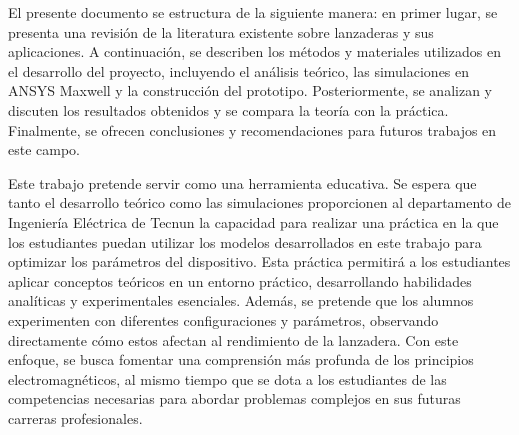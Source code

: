 El presente documento se estructura de la siguiente manera: en primer lugar, se presenta una revisión de la literatura existente sobre lanzaderas y sus aplicaciones. A continuación, se describen los métodos y materiales utilizados en el desarrollo del proyecto, incluyendo el análisis teórico, las simulaciones en ANSYS Maxwell y la construcción del prototipo. Posteriormente, se analizan y discuten los resultados obtenidos y se compara la teoría con la práctica. Finalmente, se ofrecen conclusiones y recomendaciones para futuros trabajos en este campo.

Este trabajo pretende servir como una herramienta educativa. Se espera que tanto el desarrollo teórico como las simulaciones proporcionen al departamento de Ingeniería Eléctrica de Tecnun la capacidad para realizar una práctica en la que los estudiantes puedan utilizar los modelos desarrollados en este trabajo para optimizar los parámetros del dispositivo. Esta práctica permitirá a los estudiantes aplicar conceptos teóricos en un entorno práctico, desarrollando habilidades analíticas y experimentales esenciales. Además, se pretende que los alumnos experimenten con diferentes configuraciones y parámetros, observando directamente cómo estos afectan al rendimiento de la lanzadera. Con este enfoque, se busca fomentar una comprensión más profunda de los principios electromagnéticos, al mismo tiempo que se dota a los estudiantes de las competencias necesarias para abordar problemas complejos en sus futuras carreras profesionales.